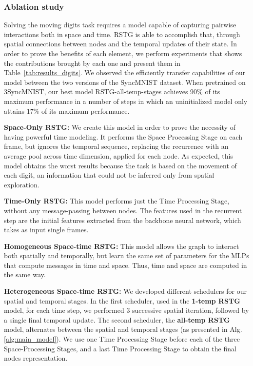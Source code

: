 \documentclass{article}
\begin{document}
\subsubsection{Ablation study} 

Solving the moving digits task requires a model capable of capturing pairwise interactions both in space and time. RSTG is able to accomplish that, through spatial connections between nodes and the temporal updates of their state. In order to prove the benefits of each element, we perform experiments that shows the contributions brought by each one and present them in Table~\ref{tab:results_digits}.
We observed the efficiently transfer capabilities of our model between the two versions of the SyncMNIST dataset. When pretrained on 3SyncMNIST, our best model RSTG-all-temp-stages achieves $90 \% $ of its maximum performance in a number of steps in which an uninitialized model only attains $17 \% $ of its maximum performance.

\textbf{Space-Only RSTG:} We create this model in order to prove the necessity of having powerful time modeling. It performs the Space Processing Stage on each frame, but ignores the temporal sequence, replacing the recurrence with an average pool across time dimension, applied for each node. As expected, this model obtains the worst results because the task is based on the movement of each digit, an information that could not be inferred only from spatial exploration.

\textbf{Time-Only RSTG:} This model performs just the Time Processing Stage, without any message-passing between nodes. The features used in the recurrent step are the initial features extracted from the backbone neural network, which takes as input single frames.

\textbf{Homogeneous Space-time RSTG:} This model allows the graph to interact both spatially and temporally, but learn the same set of parameters for the MLPs that compute messages in time and space. Thus, time and space are computed in the same way.

\newpage
\textbf{Heterogeneous Space-time RSTG:} We developed different schedulers for our spatial and temporal stages. In the first scheduler, used in the \textbf{1-temp RSTG} model, for each time step, we performed 3 successive spatial iteration, followed by a single final temporal update. The second scheduler, the \textbf{all-temp RSTG} model, alternates between the spatial and temporal stages (as presented in Alg.\ref{alg:main_model}).  We use one Time Processing Stage before each of the three Space-Processing Stages, and a last Time Processing Stage to obtain the final nodes representation.
\end{document}

